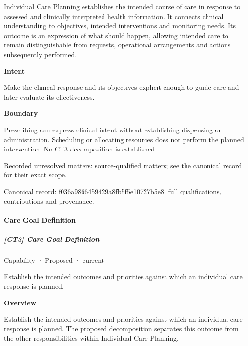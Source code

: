 Individual Care Planning establishes the intended course of care in response to assessed and clinically interpreted health information. It connects clinical understanding to objectives, intended interventions and monitoring needs. Its outcome is an expression of what should happen, allowing intended care to remain distinguishable from requests, operational arrangements and actions subsequently performed.



\textbf{Intent}



Make the clinical response and its objectives explicit enough to guide care and later evaluate its effectiveness.



\textbf{Boundary}



Prescribing can express clinical intent without establishing dispensing or administration. Scheduling or allocating resources does not perform the planned intervention. No CT3 decomposition is established.


{\small Recorded unresolved matters: source-qualified matters; see the canonical record for their exact scope.}\par
{\footnotesize \href{../../../../continuum/strategy/capability/f036a9866459429a8fb5f5e10727b5e8.md}{Canonical record: f036a9866459429a8fb5f5e10727b5e8}; full qualifications, contributions and provenance.}\par
\paragraph{Care Goal Definition}

\subparagraph{[CT3] Care Goal Definition}

\label{element:609e1bef516b44bb976b5dbebe7f684b}
{\small Capability · Proposed · current}\par

Establish the intended outcomes and priorities against which an individual care response is planned.



\textbf{Overview}



Establish the intended outcomes and priorities against which an individual care response is planned. The proposed decomposition separates this outcome from the other responsibilities within Individual Care Planning.



